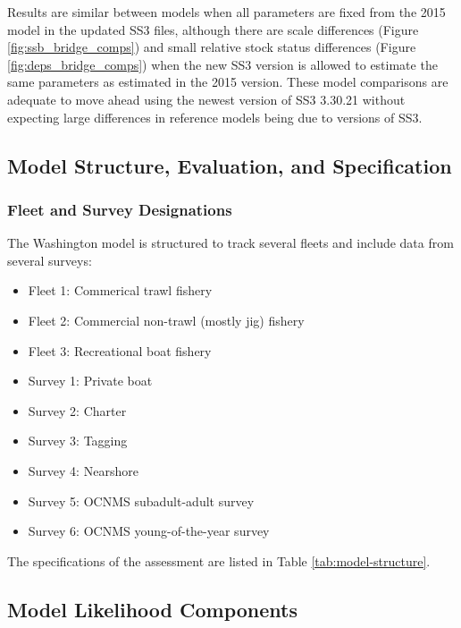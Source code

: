 \documentclass[11pt,
  english,
  letterpaper,
]{article}
\providecommand{\tightlist}{%
  \setlength{\itemsep}{0pt}\setlength{\parskip}{0pt}}
\providecommand{\tightlist}{%
  \setlength{\itemsep}{0pt}\setlength{\parskip}{0pt}}
\begin{document}
Results are similar between models when all parameters are fixed from the 2015 model in the updated SS3 files, although there are scale differences (Figure \ref{fig:ssb_bridge_comps}) and small relative stock status differences (Figure \ref{fig:deps_bridge_comps}) when the new SS3 version is allowed to estimate the same parameters as estimated in the 2015 version. These model comparisons are adequate to move ahead using the newest version of SS3 3.30.21 without expecting large differences in reference models being due to versions of SS3.

\hypertarget{model-structure-evaluation-and-specification}{%
\subsection{Model Structure, Evaluation, and Specification}\label{model-structure-evaluation-and-specification}}

\hypertarget{fleet-and-survey-designations}{%
\subsubsection{Fleet and Survey Designations}\label{fleet-and-survey-designations}}

The Washington model is structured to track several fleets and include data from several surveys:

\begin{itemize}
\tightlist
\item
  Fleet 1: Commerical trawl fishery
\item
  Fleet 2: Commercial non-trawl (mostly jig) fishery
\item
  Fleet 3: Recreational boat fishery
\item
  Survey 1: Private boat\\
\item
  Survey 2: Charter
\item
  Survey 3: Tagging
\item
  Survey 4: Nearshore
\item
  Survey 5: OCNMS subadult-adult survey
\item
  Survey 6: OCNMS young-of-the-year survey
\end{itemize}

The specifications of the assessment are listed in Table \ref{tab:model-structure}.

\hypertarget{model-likelihood-components}{%
\subsection{Model Likelihood Components}\label{model-likelihood-components}}
\end{document}
